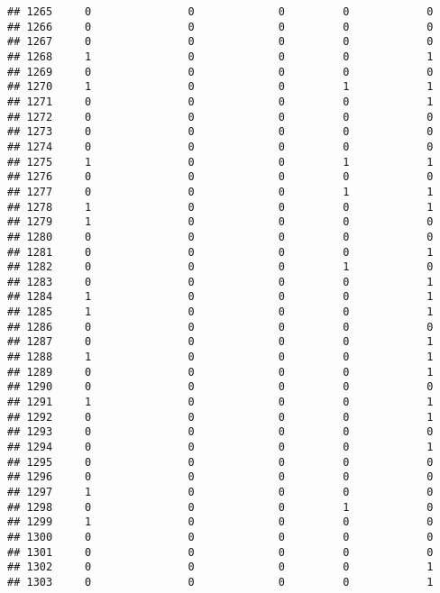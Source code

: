 \documentclass[]{article}
\begin{document}
\begin{verbatim}
## 1265     0               0             0         0            0
## 1266     0               0             0         0            0
## 1267     0               0             0         0            0
## 1268     1               0             0         0            1
## 1269     0               0             0         0            0
## 1270     1               0             0         1            1
## 1271     0               0             0         0            1
## 1272     0               0             0         0            0
## 1273     0               0             0         0            0
## 1274     0               0             0         0            0
## 1275     1               0             0         1            1
## 1276     0               0             0         0            0
## 1277     0               0             0         1            1
## 1278     1               0             0         0            1
## 1279     1               0             0         0            0
## 1280     0               0             0         0            0
## 1281     0               0             0         0            1
## 1282     0               0             0         1            0
## 1283     0               0             0         0            1
## 1284     1               0             0         0            1
## 1285     1               0             0         0            1
## 1286     0               0             0         0            0
## 1287     0               0             0         0            1
## 1288     1               0             0         0            1
## 1289     0               0             0         0            1
## 1290     0               0             0         0            0
## 1291     1               0             0         0            1
## 1292     0               0             0         0            1
## 1293     0               0             0         0            0
## 1294     0               0             0         0            1
## 1295     0               0             0         0            0
## 1296     0               0             0         0            0
## 1297     1               0             0         0            0
## 1298     0               0             0         1            0
## 1299     1               0             0         0            0
## 1300     0               0             0         0            0
## 1301     0               0             0         0            0
## 1302     0               0             0         0            1
## 1303     0               0             0         0            1

\end{verbatim}
\end{document}
